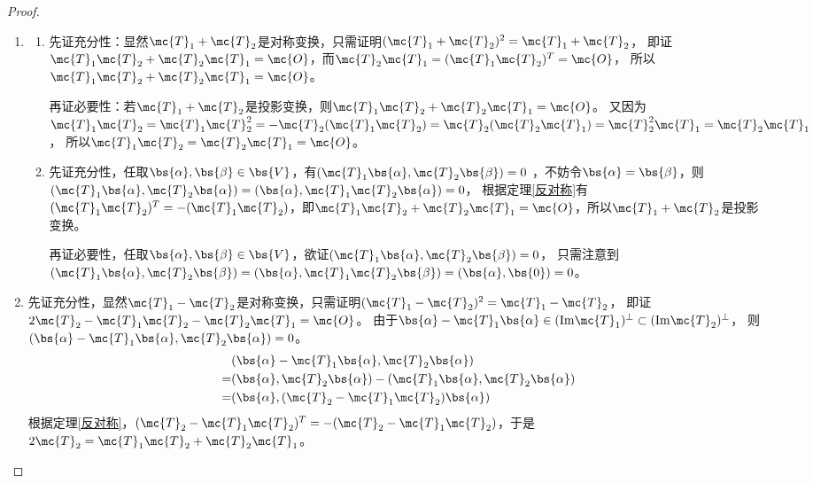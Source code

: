\documentclass[12pt, a4paper, oneside, UTF8]{ctexbook}
\begin{document}
\begin{proof}
\begin{enumerate}[label=(\arabic*)]
        \item \begin{enumerate}
            \item 
            先证充分性：显然$\mc{T}_1+\mc{T}_2$是对称变换，只需证明$(\mc{T}_1+\mc{T}_2)^2=\mc{T}_1+\mc{T}_2$，
            即证$\mc{T}_1\mc{T}_2+\mc{T}_2\mc{T}_1=\mc{O}$，而$\mc{T}_2\mc{T}_1=(\mc{T}_1\mc{T}_2)^T=\mc{O}$，
            所以$\mc{T}_1\mc{T}_2+\mc{T}_2\mc{T}_1=\mc{O}$。
            
            再证必要性：若$\mc{T}_1+\mc{T}_2$是投影变换，则$\mc{T}_1\mc{T}_2+\mc{T}_2\mc{T}_1=\mc{O}$。
            又因为$\mc{T}_1\mc{T}_2=\mc{T}_1\mc{T}^2_2=-\mc{T}_2(\mc{T}_1\mc{T}_2)=\mc{T}_2(\mc{T}_2\mc{T}_1)=\mc{T}^2_2\mc{T}_1=\mc{T}_2\mc{T}_1$，
            所以$\mc{T}_1\mc{T}_2=\mc{T}_2\mc{T}_1=\mc{O}$。

            \item 先证充分性，任取$\bs{\alpha},\bs{\beta} \in \bs{V}$，有$(\mc{T}_1\bs{\alpha},\mc{T}_2\bs{\beta})=0$
        ，不妨令$\bs{\alpha}=\bs{\beta}$，则
        $
            (\mc{T}_1\bs{\alpha},\mc{T}_2\bs{\alpha}) 
            =(\bs{\alpha},\mc{T}_1\mc{T}_2\bs{\alpha})=0
        $，
        根据定理\ref{反对称}有$(\mc{T}_1\mc{T}_2)^T=-(\mc{T}_1\mc{T}_2)$，即$\mc{T}_1\mc{T}_2+\mc{T}_2\mc{T}_1=\mc{O}$，所以$\mc{T}_1+\mc{T}_2$是投影变换。

        再证必要性，任取$\bs{\alpha},\bs{\beta} \in \bs{V}$，欲证$(\mc{T}_1\bs{\alpha},\mc{T}_2\bs{\beta})=0$，
        只需注意到$(\mc{T}_1\bs{\alpha},\mc{T}_2\bs{\beta})=(\bs{\alpha},\mc{T}_1\mc{T}_2\bs{\beta})=(\bs{\alpha},\bs{0})=0$。
        \end{enumerate}
        \item 先证充分性，显然$\mc{T}_1-\mc{T}_2$是对称变换，只需证明$(\mc{T}_1-\mc{T}_2)^2=\mc{T}_1-\mc{T}_2$，
        即证$2\mc{T}_2-\mc{T}_1\mc{T}_2-\mc{T}_2\mc{T}_1=\mc{O}$。
        由于$\bs{\alpha}-\mc{T}_1\bs{\alpha} \in (\mathrm{Im}\mc{T}_1)^{\perp} \subset (\mathrm{Im}\mc{T}_2)^{\perp} $，
        则$(\bs{\alpha}-\mc{T}_1\bs{\alpha},\mc{T}_2\bs{\alpha})=0$。
        \begin{align*}
            &(\bs{\alpha}-\mc{T}_1\bs{\alpha},\mc{T}_2\bs{\alpha})\\
            =&(\bs{\alpha},\mc{T}_2 \bs{\alpha})-(\mc{T}_1\bs{\alpha},\mc{T}_2 \bs{\alpha}) \\
            =&(\bs{\alpha},(\mc{T}_2-\mc{T}_1\mc{T}_2 )\bs{\alpha}) 
        \end{align*}
        根据定理\ref{反对称}，$(\mc{T}_2-\mc{T}_1\mc{T}_2)^T=-(\mc{T}_2-\mc{T}_1\mc{T}_2)$，于是$2\mc{T}_2=\mc{T}_1\mc{T}_2+\mc{T}_2\mc{T}_1$。


\end{enumerate}
\end{proof}
\end{document}
